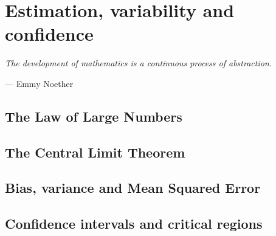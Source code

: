 \chapter{Estimation, variability and confidence}
\label{chapter3}

\epigraph{\textit{The development of mathematics is a continuous process of abstraction.}}{— Emmy Noether}

\section{The Law of Large Numbers}

\section{The Central Limit Theorem}

\section{Bias, variance and Mean Squared Error}

\section{Confidence intervals and critical regions}
